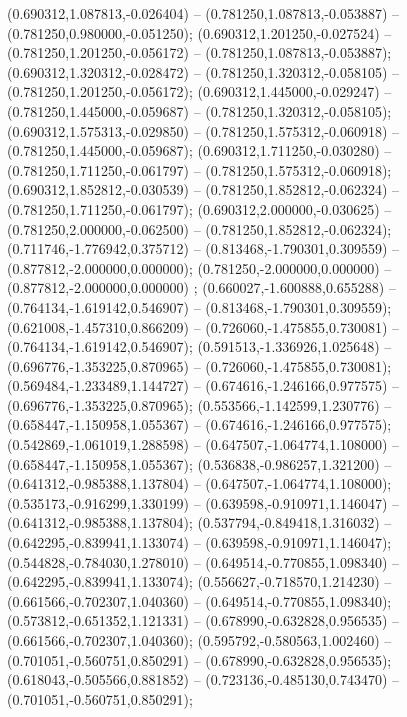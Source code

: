  (0.690312,1.087813,-0.026404) -- (0.781250,1.087813,-0.053887) -- (0.781250,0.980000,-0.051250);
 (0.690312,1.201250,-0.027524) -- (0.781250,1.201250,-0.056172) -- (0.781250,1.087813,-0.053887);
 (0.690312,1.320312,-0.028472) -- (0.781250,1.320312,-0.058105) -- (0.781250,1.201250,-0.056172);
 (0.690312,1.445000,-0.029247) -- (0.781250,1.445000,-0.059687) -- (0.781250,1.320312,-0.058105);
 (0.690312,1.575313,-0.029850) -- (0.781250,1.575312,-0.060918) -- (0.781250,1.445000,-0.059687);
 (0.690312,1.711250,-0.030280) -- (0.781250,1.711250,-0.061797) -- (0.781250,1.575312,-0.060918);
 (0.690312,1.852812,-0.030539) -- (0.781250,1.852812,-0.062324) -- (0.781250,1.711250,-0.061797);
 (0.690312,2.000000,-0.030625) -- (0.781250,2.000000,-0.062500) -- (0.781250,1.852812,-0.062324);
 (0.711746,-1.776942,0.375712) -- (0.813468,-1.790301,0.309559) -- (0.877812,-2.000000,0.000000);
 (0.781250,-2.000000,0.000000) -- (0.877812,-2.000000,0.000000) ;
 (0.660027,-1.600888,0.655288) -- (0.764134,-1.619142,0.546907) -- (0.813468,-1.790301,0.309559);
 (0.621008,-1.457310,0.866209) -- (0.726060,-1.475855,0.730081) -- (0.764134,-1.619142,0.546907);
 (0.591513,-1.336926,1.025648) -- (0.696776,-1.353225,0.870965) -- (0.726060,-1.475855,0.730081);
 (0.569484,-1.233489,1.144727) -- (0.674616,-1.246166,0.977575) -- (0.696776,-1.353225,0.870965);
 (0.553566,-1.142599,1.230776) -- (0.658447,-1.150958,1.055367) -- (0.674616,-1.246166,0.977575);
 (0.542869,-1.061019,1.288598) -- (0.647507,-1.064774,1.108000) -- (0.658447,-1.150958,1.055367);
 (0.536838,-0.986257,1.321200) -- (0.641312,-0.985388,1.137804) -- (0.647507,-1.064774,1.108000);
 (0.535173,-0.916299,1.330199) -- (0.639598,-0.910971,1.146047) -- (0.641312,-0.985388,1.137804);
 (0.537794,-0.849418,1.316032) -- (0.642295,-0.839941,1.133074) -- (0.639598,-0.910971,1.146047);
 (0.544828,-0.784030,1.278010) -- (0.649514,-0.770855,1.098340) -- (0.642295,-0.839941,1.133074);
 (0.556627,-0.718570,1.214230) -- (0.661566,-0.702307,1.040360) -- (0.649514,-0.770855,1.098340);
 (0.573812,-0.651352,1.121331) -- (0.678990,-0.632828,0.956535) -- (0.661566,-0.702307,1.040360);
 (0.595792,-0.580563,1.002460) -- (0.701051,-0.560751,0.850291) -- (0.678990,-0.632828,0.956535);
 (0.618043,-0.505566,0.881852) -- (0.723136,-0.485130,0.743470) -- (0.701051,-0.560751,0.850291);
